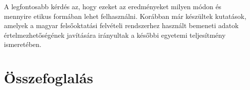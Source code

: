 \documentclass[12pt]{article}
\begin{document}
A legfontosabb kérdés az, hogy ezeket az eredményeket milyen módon és mennyire etikus formában lehet felhasználni. Korábban már készültek kutatások, amelyek a magyar felsőoktatási felvételi rendszerhez használt bemeneti adatok értelmezhetőségének javítására irányultak a későbbi egyetemi teljesítmény ismeretében.\cite{molontay1, molontay2}



\section{Összefoglalás}


\end{document}
